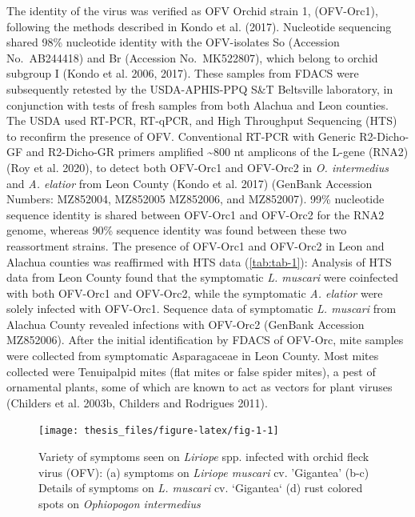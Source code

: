 \documentclass[12pt,final,CPage]{ufthesis}
\begin{document}
{  The identity of the virus was verified as OFV Orchid strain 1, (OFV-Orc1), following the methods described in Kondo et al. (2017). Nucleotide sequencing shared 98\% nucleotide identity with the OFV-isolates So (Accession No.~AB244418) and Br (Accession No.~MK522807), which belong to orchid subgroup I (Kondo et al. 2006, 2017). These samples from FDACS were subsequently retested by the USDA-APHIS-PPQ S\&T Beltsville laboratory, in conjunction with tests of fresh samples from both Alachua and Leon counties. The USDA used RT-PCR, RT-qPCR, and High Throughput Sequencing (HTS) to reconfirm the presence of OFV. Conventional RT-PCR with Generic R2-Dicho-GF and R2-Dicho-GR primers amplified \textasciitilde800 nt amplicons of the L-gene (RNA2) (Roy et al. 2020), to detect both OFV-Orc1 and OFV-Orc2 in \emph{O. intermedius} and \emph{A. elatior} from Leon County (Kondo et al. 2017) (GenBank Accession Numbers: MZ852004, MZ852005 MZ852006, and MZ852007). 99\% nucleotide sequence identity is shared between OFV-Orc1 and OFV-Orc2 for the RNA2 genome, whereas 90\% sequence identity was found between these two reassortment strains. The presence of OFV-Orc1 and OFV-Orc2 in Leon and Alachua counties was reaffirmed with HTS data (\ref{tab:tab-1}): Analysis of HTS data from Leon County found that the symptomatic \emph{L. muscari} were coinfected with both OFV-Orc1 and OFV-Orc2, while the symptomatic \emph{A. elatior} were solely infected with OFV-Orc1. Sequence data of symptomatic \emph{L. muscari} from Alachua County revealed infections with OFV-Orc2 (GenBank Accession MZ852006). After the initial identification by FDACS of OFV-Orc, mite samples were collected from symptomatic Asparagaceae in Leon County. Most mites collected were Tenuipalpid mites (flat mites or false spider mites), a pest of ornamental plants, some of which are known to act as vectors for plant viruses (Childers et al. 2003b, Childers and Rodrigues 2011).
  \begin{figure}

  {\centering \texttt{[image: thesis\_files/figure-latex/fig-1-1]} 

  }

  \caption{Variety of symptoms seen on \textit{Liriope} spp. infected with orchid fleck virus (OFV): (a) symptoms on \textit{Liriope muscari} cv. 'Gigantea' (b-c) Details of symptoms on \textit{L. muscari} cv. `Gigantea` (d) rust colored spots on \textit{Ophiopogon intermedius}}\label{fig:fig-1}
  \end{figure}
  \begin{figure}


\end{figure}}
\end{document}
